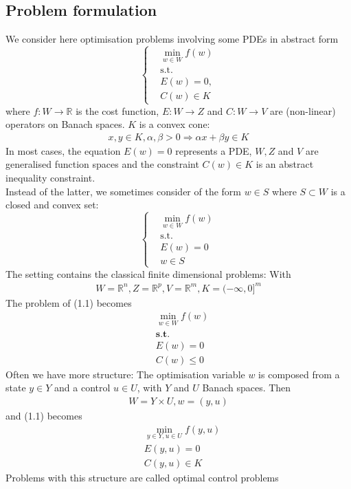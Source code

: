 \documentclass[a4paper,11pt,fleqn]{book}
\theoremstyle{definition}
\theoremstyle{remark}
\begin{document}
\subsection{Problem formulation}
We consider here optimisation problems involving some PDEs in abstract form 
\begin{equation}
\left\{
\begin{aligned}
	&\min_{w \in W} f(w)\\ 
	&\text{s.t.}\\
	&E(w) = 0, \\
	&C(w) \in K
\end{aligned}
\right.
\end{equation}
where $f: W \rightarrow \mathbb{R}$ is the cost function, $E: W\rightarrow Z$ and $C: W \rightarrow V$ are (non-linear) operators on Banach spaces. $K$ is a convex cone:
\begin{align*}
	x, y \in K, \alpha, \beta > 0 \Rightarrow \alpha x + \beta y \in K
\end{align*}
In most cases, the equation $E(w) = 0$ represents a PDE, $W, Z$ and $V$ are generalised function spaces and the constraint $C(w) \in K$ is an abstract inequality constraint. \\
Instead of the latter, we sometimes consider of the form $w \in S$ where $S \subset W$ is a closed and convex set:
\begin{equation*}
\left\{
\begin{aligned}
	&\min_{w \in W} f(w)\\
	&\text{s.t.}\\
	&E(w) = 0\\
	&w \in S
\end{aligned}
\right.
\end{equation*}
The setting contains the classical finite dimensional problems: With
\begin{align*}
	W = \mathbb{R}^n, Z = \mathbb{R}^p, V = \mathbb{R}^m, K = (-\infty, 0]^m
\end{align*}
The problem of (1.1) becomes 
\begin{align*}
	&\min_{w \in W} f(w) \\
	&\textbf{s.t.} \\
	&E(w) = 0\\
	&C(w) \le 0
\end{align*}
Often we have more structure: The optimisation variable $w$ is composed from a state $y \in Y$ and a control $u \in U$, with $Y$ and $U$ Banach spaces. Then
\begin{align*}
	W = Y \times U, w = (y, u)
\end{align*}
and (1.1) becomes
\begin{align*}
	&\min_{y \in Y, u \in U} f(y, u) \\
	&E(y, u) = 0\\
	&C(y, u) \in K
\end{align*}
Problems with this structure are called optimal control problems
\end{document}

